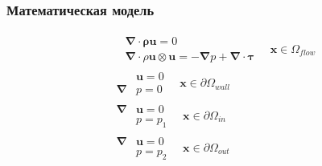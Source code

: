 \documentclass[10pt,xcolor={dvipsnames,table},aspectratio=169]{beamer}
\begin{document}
    \begin{frame}{}

        \justifying
        \normalsize

        \frametitle{Математическая модель}

        \[
            \begin{aligned}
                &\begin{aligned}
                    &\symbf{\nabla} \cdot \symbf{\rho u} = 0 \\
                    &\symbf{\nabla} \cdot \rho \symbf{u} \otimes \symbf{u}
                    =
                    - \symbf{\nabla} p
                    + \symbf{\nabla} \cdot \symbf{\tau}
                \end{aligned} \quad \symbf{x} \in \Omega_{flow} \\
                &\begin{aligned}
                    &\symbf{u} = 0 \\
                    \symbf{\nabla} &p = 0
                \end{aligned} \quad \symbf{x} \in \partial \Omega_{wall} \\
                &\begin{aligned}
                    \symbf{\nabla} &\symbf{u} = 0 \\
                    &p = p_{1}
                \end{aligned} \quad \symbf{x} \in \partial \Omega_{in} \\
                &\begin{aligned}
                    \symbf{\nabla} &\symbf{u} = 0 \\
                    &p = p_{2}
                \end{aligned} \quad \symbf{x} \in \partial \Omega_{out}
            \end{aligned}
        \]

    \end{frame}{}
\end{document}
